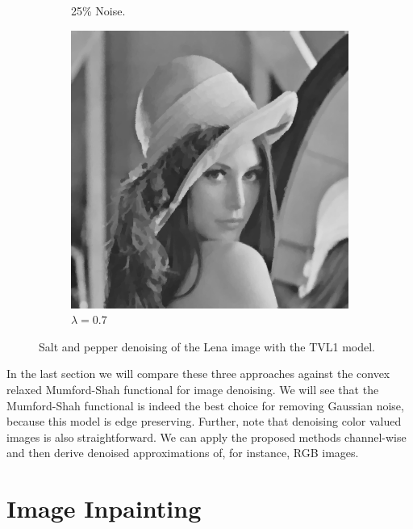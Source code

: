 \documentclass[abstracton]{scrreprt}
\begin{document}
\begin{figure}[!ht]
\begin{subfigure}[b]{0.31\textwidth}
                    \caption{25\% Noise.}
                \end{subfigure}
                \begin{subfigure}[b]{0.31\textwidth}
                    \includegraphics[width=\textwidth]{img/denoising/salt_and_pepper_noise/07lena.png}
                    \caption{$\lambda = 0.7$}
                \end{subfigure}
                \caption[Salt and pepper denoising example: TVL1.]{Salt and pepper denoising of the Lena image with the TVL1 model.}
            \label{fig:denoising_lena_tvl1_sap}
            \end{figure}

        In the last section we will compare these three approaches against the convex relaxed Mumford-Shah functional for image denoising. We will see that the Mumford-Shah functional is indeed the best choice for removing Gaussian noise, because this model is edge preserving. Further, note that denoising color valued images is also straightforward. We can apply the proposed methods channel-wise and then derive denoised approximations of, for instance, RGB images.


    \section{Image Inpainting} %
    \label{sec:image_inpainting}
\end{document}
